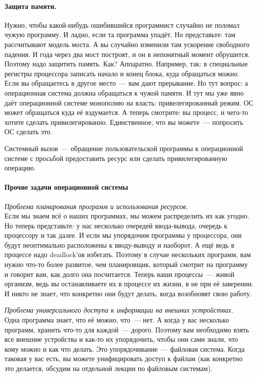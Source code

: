 \documentclass{article}
\begin{document}
    \paragraph{Защита памяти.}
    Нужно, чтобы какой-нибудь ошибившийся программист случайно не поломал чужую программу. И ладно, если та программа упадёт. Но представьте: там рассчитывают модель моста. А вы случайно изменили там ускорение свободного падения. И года через два мост построят, и он в непонятный момент обрушится. Поэтому надо защитить память. Как? Аппаратно. Например, так: в специальные регистры процессора записать начало и конец блока, куда обращаться можно. Если вы обращаетесь в другое место~--- вам дают прерывание. Но тут вопрос: а операционная система должна обращаться к чужой памяти. И тут мы уже явно даёт операционной системе монополию на власть: привелегированный режим. ОС может обращаться куда её вздумается. А теперь смотрите: вы процесс, и чего-то хотите сделать привилегированно. Единственное, что вы можете~--- попросить ОС сделать это.
    \begin{definition}
        Системный вызов~--- обращение пользовательской программы к операционной системе с просьбой предоставить ресурс или сделать привилегированную операцию.
    \end{definition}

    \paragraph{Прочие задачи операционной системы}\mbox{}

    \textit{Проблема планирования программ и использования ресурсов.}\\
    Если мы знаем всё о наших программах, мы можем распределить их как угодно. Но теперь представьте: у нас несколько очередей ввода-вывода, очередь к процессору и так далее. И если мы упорядочим программы у процессора, они будут неоптимально расположены к вводу-выводу и наоборот. А ещё ведь в процессе надо deadlock'ов избегать. Поэтому в случае нескольких программ, вам нужно что-то более развитое, чем планировщик, который смотрит на программу и говорит вам, как долго она посчитается. Теперь ваши процессы~--- живой организм, ведь вы останавливаете их в процессе их жизни, в не при её заверении. И никто не знает, что конкретно они будут делать, когда возобновят свою работу.
    
    \textit{Проблема универсального доступа к информации на внешних устройствах.}\\
    Одна программа знает, что её можно, что~--- нет. А когда у вас несколько программ, хранить что-то для каждой~--- дорого. Поэтому вам необходимо взять все внешние устройства и как-то их упорядочить, чтобы они сами знали, что кому можно и как что делать. Это упорядочивание~--- файловая система. Когда таковая у вас есть, вы можете унифицировать доступ к файлам (как конкретно это делается, обсудим на отдельной лекции по файловым системам).
    
\end{document}
